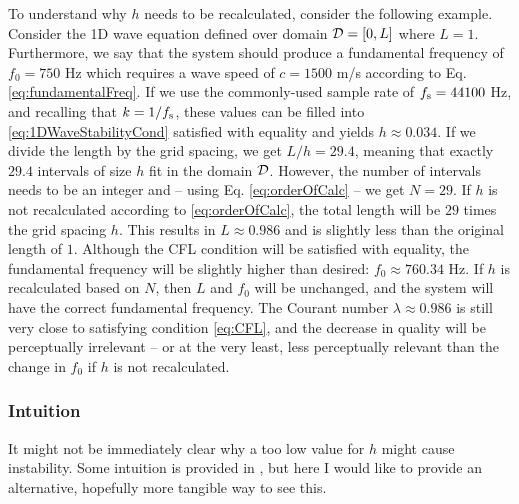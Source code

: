 To understand why $h$ needs to be recalculated, consider the following example. Consider the 1D wave equation defined over domain $\mathcal{D} = [0, L]$ where $L = 1$. Furthermore, we say that the system should produce a fundamental frequency of $f_0 = 750$ Hz which requires a wave speed of $c = 1500$ m/s according to Eq. \eqref{eq:fundamentalFreq}. If we use the commonly-used sample rate of $f_\text{s} = 44100$ Hz, and recalling that $k = 1/f_\text{s}$, these values can be filled into \eqref{eq:1DWaveStabilityCond} satisfied with equality and yields $h \approx 0.034$. If we divide the length by the grid spacing, we get $L / h = 29.4$, meaning that exactly $29.4$ intervals of size $h$ fit in the domain $\mathcal{D}$. However, the number of intervals needs to be an integer and -- using Eq. \eqref{eq:orderOfCalc} -- we get $N = 29$. If $h$ is not recalculated according to \eqref{eq:orderOfCalc}, the total length will be $29$ times the grid spacing $h$. This results in $L \approx 0.986$ and is slightly less than the original length of $1$. Although the CFL condition will be satisfied with equality, the fundamental frequency will be slightly higher than desired: $f_0 \approx 760.34$ Hz. If $h$ is recalculated based on $N$, then $L$ and $f_0$ will be unchanged, and the system will have the correct fundamental frequency. The Courant number $\lambda \approx 0.986$ is still very close to satisfying condition \eqref{eq:CFL}, and the decrease in quality will be perceptually irrelevant -- or at the very least, less perceptually relevant than the change in $f_0$ if $h$ is not recalculated.


\subsubsection{Intuition}
It might not be immediately clear why a too low value for $h$ might cause instability. Some intuition is provided in \cite[Fig. 6.9]{theBible}, but here I would like to provide an alternative, hopefully more tangible way to see this. 


